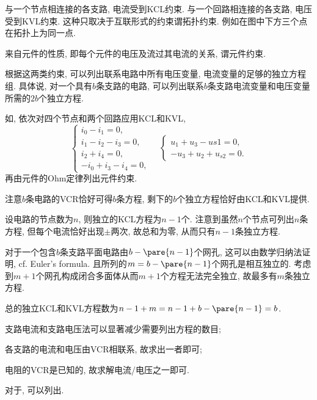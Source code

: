 \documentclass{ctexart}
\begin{document}
与一个节点相连接的各支路, 电流受到KCL约束. 与一个回路相连接的各支路, 电压受到KVL约束. 这种只取决于互联形式的约束谓拓扑约束. 例如在图中下方三个点在拓扑上为同一点.
\par
来自元件的性质, 即每个元件的电压及流过其电流的关系, 谓元件约束.
\par
根据这两类约束, 可以列出联系电路中所有电压变量, 电流变量的足够的独立方程组. 具体说, 对一个具有$b$条支路的电路, 可以列出联系$b$条支路电流变量和电压变量所需的$2b$个独立方程.
\par
\begin{sample}
    \begin{ex}
        如, 依次对四个节点和两个回路应用KCL和KVL,
        \[ \begin{cases}
            i_0 - i_1 = 0,\\
            i_1-i_2-i_3 = 0,\\
            i_2+i_4 = 0,\\
            -i_0 + i_3 - i_4 = 0,
        \end{cases}\quad\begin{cases}
            u_1+u_3-u{s1} = 0,\\
            -u_3+u_2+u_{s2} = 0.
        \end{cases} \]
        再由元件的Ohm定律列出元件约束.
    \end{ex}
\end{sample}
注意$b$条电路的VCR恰好可得$b$条方程, 剩下的$b$个独立方程恰好由KCL和KVL提供.
\par
设电路的节点数为$n$, 则独立的KCL方程为$n-1$个. 注意到虽然$n$个节点可列出$n$条方程, 但每个电流恰好出现$\pm$两次, 故总和为零, 从而只有$n-1$条独立方程.
\par
对于一个包含$b$条支路平面电路由$b-\pare{n-1}$个网孔, 这可以由数学归纳法证明, cf. Euler's formula. 且所列的$m=b-\pare{n-1}$个网孔是相互独立的. 考虑到$m+1$个网孔构成闭合多面体从而$m+1$个方程无法完全独立, 故最多有$m$条独立方程.
\par
总的独立KCL和KVL方程数为$n-1+m = n-1+b-\pare{n-1} = b$.
\begin{cenum}
    \item 支路电流和支路电压法可以显著减少需要列出方程的数目;
    \item 各支路的电流和电压由VCR相联系, 故求出一者即可;
    \item 电阻的VCR是已知的, 故求解电流/电压之一即可.
\end{cenum}
\begin{sample}
    \begin{ex}
        对于, 可以列出.
    \end{ex}
\end{sample}


\end{document}
